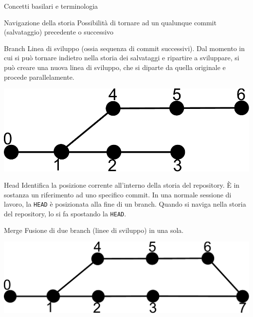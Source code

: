 \documentclass[xcolor=dvipsnames,presentation]{beamer}
\begin{document}
\begin{frame}[allowframebreaks]{Concetti basilari e terminologia}
    \begin{block}{Navigazione della storia}
        Possibilità di tornare ad un qualunque commit (salvataggio) precedente o successivo
    \end{block}
    \begin{block}{Branch}
        Linea di sviluppo (ossia sequenza di commit successivi). Dal momento in cui si può tornare indietro nella storia dei salvataggi e ripartire a sviluppare, si può creare una nuova linea di sviluppo, che si diparte da quella originale e procede parallelamente.
        \begin{center}
            \includegraphics[height=.4\textheight]{img/branch}
        \end{center}
    \end{block}
    \begin{block}{Head}
        Identifica la posizione corrente all'interno della storia del repository.
        È in sostanza un riferimento ad uno specifico commit.
        In una normale sessione di lavoro, la \texttt{HEAD} è posizionata alla fine di un branch.
        Quando si naviga nella storia del repository, lo si fa spostando la \texttt{HEAD}.
    \end{block}
    \begin{block}{Merge}
        Fusione di due branch (linee di sviluppo) in una sola.
        \begin{center}
            \includegraphics[width=.99\textwidth]{img/merge}
        \end{center}
    \end{block}
\end{frame}
\end{document}

